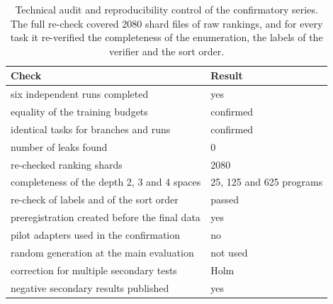\begin{table}[!tbh]
\centering\footnotesize\setlength{\tabcolsep}{6pt}
\begin{tabular}{|p{.52\linewidth}|l|}
\hline
\textbf{Check} & \textbf{Result} \\
\hline
six independent runs completed & yes \\ \hline
equality of the training budgets & confirmed \\ \hline
identical tasks for branches and runs & confirmed \\ \hline
number of leaks found & 0 \\ \hline
re-checked ranking shards & 2080 \\ \hline
completeness of the depth 2, 3 and 4 spaces & 25, 125 and 625 programs \\ \hline
re-check of labels and of the sort order & passed \\ \hline
preregistration created before the final data & yes \\ \hline
pilot adapters used in the confirmation & no \\ \hline
random generation at the main evaluation & not used \\ \hline
correction for multiple secondary tests & Holm \\ \hline
negative secondary results published & yes \\ \hline
\end{tabular}
\caption{Technical audit and reproducibility control of the confirmatory series. The
full re-check covered 2080 shard files of raw rankings, and for every task it
re-verified the completeness of the enumeration, the labels of the verifier and the
sort order.}
\label{tab:audit}
\end{table}
